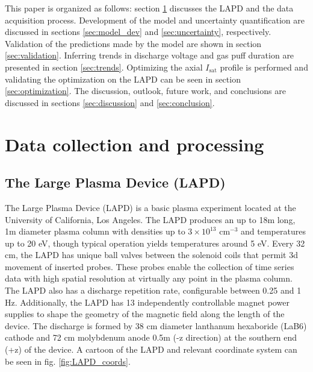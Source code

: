 This paper is organized as follows: section \ref{sec:data} discusses the LAPD and the data acquisition process. Development of the model and uncertainty quantification are discussed in sections \ref{sec:model_dev} and \ref{sec:uncertainty}, respectively. Validation of the predictions made by the model are shown in section \ref{sec:validation}. Inferring trends in discharge voltage and gas puff duration are presented in section \ref{sec:trends}. Optimizing the axial $I_\text{sat}$ profile is performed and validating the optimization on the LAPD can be seen in section \ref{sec:optimization}. The discussion, outlook, future work, and conclusions are discussed in sections \ref{sec:discussion} and \ref{sec:conclusion}.

\section{Data collection and processing}
\label{sec:data}

\subsection{The Large Plasma Device (LAPD)}


The Large Plasma Device (LAPD)\cite{gekelman_upgraded_2016,qian_design_2023} is a basic plasma experiment located at the University of California, Los Angeles. The LAPD produces an up to 18m long, 1m diameter plasma column with densities up to $3 \times 10^{13}$ cm$^{-3}$ and temperatures up to 20 eV, though typical operation yields temperatures around 5 eV. Every 32 cm, the LAPD has unique ball valves between the solenoid coils that permit 3d movement of inserted probes. These probes enable the collection of time series data with high spatial resolution at virtually any point in the plasma column. The LAPD also has a discharge repetition rate, configurable between 0.25 and 1 Hz. Additionally, the LAPD has 13 independently controllable magnet power supplies to shape the geometry of the magnetic field along the length of the device. The discharge is formed by 38 cm diameter lanthanum hexaboride (LaB6) cathode\cite{qian_design_2023} and 72 cm molybdenum anode 0.5m (-z direction) at the southern end (+z) of the device. A cartoon of the LAPD and relevant coordinate system can be seen in fig. \ref{fig:LAPD_coords}. 

